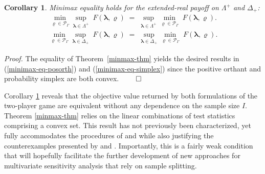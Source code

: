 \documentclass[12pt,leqno,titlepage]{amsart}
\newcommand{\1}{\mathbbm{1}}
\newtheorem{corollary}{Corollary}[]
\begin{document}
\begin{bibunit}
\begin{corollary} \label{corr1}
Minimax equality holds for the extended-real payoff on $\Lambda^+$ and $\Delta_+$:
\begin{align} \label{minimax-eq-posorth}
\min_{\boldsymbol{\varrho} \in \mathcal{P}_{\Gamma}} 
\sup_{\boldsymbol{\lambda} \in \Lambda^+} \;
F(\boldsymbol{\lambda},\boldsymbol{\varrho})
\;= \;
\sup_{\boldsymbol{\lambda} \in \Lambda^+} 
\min_{\boldsymbol{\varrho} \in \mathcal{P}_{\Gamma}} \;
F(\boldsymbol{\lambda},\boldsymbol{\varrho}). \tag{a}
\end{align}
\vspace{-3em}
\begin{align} \label{minimax-eq-simplex}
\min_{\boldsymbol{\varrho} \in \mathcal{P}_{\Gamma}} 
\sup_{\boldsymbol{\lambda} \in \Delta_+} \;
F(\boldsymbol{\lambda},\boldsymbol{\varrho})
\;= \;
\sup_{\boldsymbol{\lambda} \in \Delta_+} 
\min_{\boldsymbol{\varrho} \in \mathcal{P}_{\Gamma}} \;
F(\boldsymbol{\lambda},\boldsymbol{\varrho}). \tag{b}
\end{align}
\end{corollary}

\textit{Proof.} 
The equality of Theorem~\ref{minmax-thm} yields the desired results in (\ref{minimax-eq-posorth}) and (\ref{minimax-eq-simplex}) since the positive orthant and probability simplex are both convex. \hfill $\qed$

Corollary \ref{corr1} reveals that the objective value returned by both formulations of the two-player game  are equivalent without any dependence on the sample size $I$. Theorem \ref{minmax-thm} relies on the linear combinations of test statistics comprising a convex set.
This result has not previously been characterized, yet fully accommodates the procedures of \cite{rosenbaum2016using} and \cite{cohen2020multivariate} while also justifying the counterexamples presented by \cite{fogarty2016sensitivity} and \cite{heng2021increasing}. 
Importantly, this is a fairly weak condition that will hopefully facilitate the further development of new approaches for multivariate sensitivity analysis that rely on sample splitting.



\end{bibunit}
\end{document}
